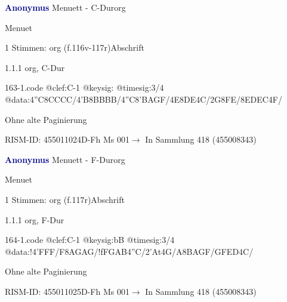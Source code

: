 \documentclass[twocolumn]{book}
\begin{document}
\par \vspace{7pt} \textcolor{darkblue}{\textbf{Anonymus  }}\hfillplus{\textbf{[163]}}\newline Menuett - C-Dur\newline org
\par \begin{itshape}[f.116v, heading:] Menuet\end{itshape} 
\par \textcolor{darkblue}{}  1 Stimmen: org  (f.116v-117r)\newline Abschrift
\par 1.1.1  org, C-Dur  
\begin{filecontents*}{163-1.code}
@clef:C-1
@keysig:
@timesig:3/4
@data:4''C{8CCCC}/4'B{8BBBB}/4''C{8'BAGF}/4E{8DE}4C/2G{8FE}/{8EDEC}4F/
\end{filecontents*}
\newline
%
\par Ohne alte Paginierung
\par RISM-ID: 455011024\newline D-Fh  Ms 001\newline $\rightarrow$ In Sammlung 418 (455008343)
      
\par \vspace{7pt} \textcolor{darkblue}{\textbf{Anonymus  }}\hfillplus{\textbf{[164]}}\newline Menuett - F-Dur\newline org
\par \begin{itshape}[f.117r, heading:] Menuet\end{itshape} 
\par \textcolor{darkblue}{}  1 Stimmen: org  (f.117r)\newline Abschrift
\par 1.1.1  org, F-Dur  
\begin{filecontents*}{164-1.code}
@clef:C-1
@keysig:bB
@timesig:3/4
@data:!4'FFF/F{8AGAG}/!f{FGAB}4''C/2'At4G/A{8BAGF}/{GFED}4C/
\end{filecontents*}
\newline
%
\par Ohne alte Paginierung
\par RISM-ID: 455011025\newline D-Fh  Ms 001\newline $\rightarrow$ In Sammlung 418 (455008343)
      
\end{document}
